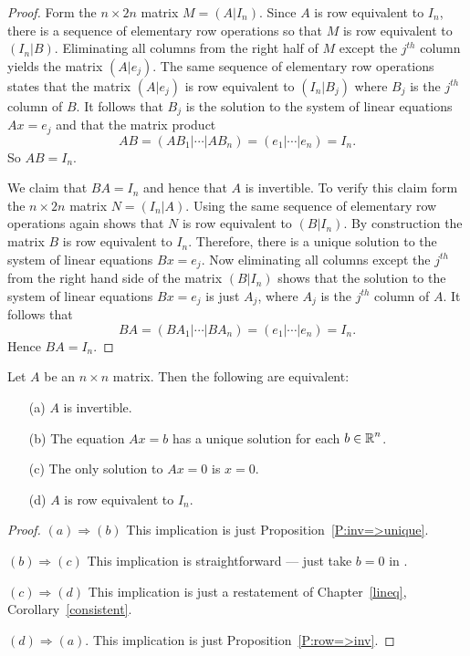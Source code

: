 \documentclass{ximera}
\begin{document}
\begin{proof}  Form the $n\times 2n$ matrix $M=(A|I_n)$.  Since $A$ is row equivalent
to $I_n$, there is a sequence of elementary row operations so that $M$ is
row equivalent to $(I_n|B)$.  Eliminating all columns from the right half
of $M$ except the $j^{th}$ column yields the matrix $(A|e_j)$.  The same
sequence of elementary row operations states that the matrix $(A|e_j)$ is
row equivalent to $(I_n|B_j)$ where $B_j$ is the $j^{th}$ column of $B$.  It
follows that $B_j$ is the solution to the system of linear equations
$Ax=e_j$ and that the matrix product
\[
AB = (AB_1|\cdots|AB_n) = (e_1|\cdots|e_n) = I_n.
\]
So $AB=I_n$.

We claim that $BA=I_n$ and hence that $A$ is invertible.  To verify this claim
form the $n\times 2n$ matrix $N=(I_n|A)$.  Using the same sequence of
elementary row operations again shows that $N$ is row equivalent to $(B|I_n)$.
By construction
the matrix $B$ is row equivalent to $I_n$.  Therefore, there is a unique
solution to the system of linear equations $Bx=e_j$.  Now eliminating all
columns except the $j^{th}$ from the right hand side of the matrix $(B|I_n)$
shows that the solution to the system of linear equations $Bx=e_j$ is just
$A_j$, where $A_j$ is the $j^{th}$ column of $A$.  It follows that
\[
BA = (BA_1|\cdots|BA_n) = (e_1|\cdots|e_n) = I_n.
\]
Hence $BA=I_n$.  \end{proof}

\begin{theorem} \label{invertequiv}
Let $A$ be an $n\times n$ matrix.  Then the following are
equivalent:
\begin{itemize}
\item[(a)]  $A$ is invertible. 
\item[(b)] The equation $Ax=b$ has a unique solution for each
$b\in\mbox{$\Bbb{R}$}^n$.
\item[(c)]  The only solution to $Ax=0$ is $x=0$.
\item[(d)]  $A$ is row equivalent to $I_n$.
\end{itemize}
\end{theorem}

\begin{proof} $(a) \Rightarrow (b)$ This implication
is just Proposition~\ref{P:inv=>unique}.

$(b) \Rightarrow (c)$ This implication is straightforward --- just
take $b=0$ in .

$(c) \Rightarrow (d)$  This implication is just a restatement of
Chapter~\ref{lineq}, Corollary~\ref{consistent}.

$(d) \Rightarrow (a)$.  This implication is just
Proposition~\ref{P:row=>inv}. \end{proof}
\end{document}
